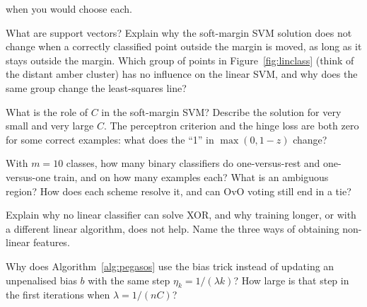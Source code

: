 \documentclass[11pt]{article}
\begin{document}
\begin{questions}
\begin{conceptual}
when you would choose each.
\item What are support vectors? Explain why the soft-margin SVM solution does not change when a correctly classified point
outside the margin is moved, as long as it stays outside the margin. Which group of points in
Figure~\ref{fig:linclass} (think of the distant amber cluster) has no influence on the linear SVM, and why does the same
group change the least-squares line?
\item What is the role of $C$ in the soft-margin SVM? Describe the solution for very small and very large $C$. The
perceptron criterion and the hinge loss are both zero for some correct examples: what does the ``1'' in $\max(0, 1 - z)$
change?
\item With $m = 10$ classes, how many binary classifiers do one-versus-rest and one-versus-one train, and on how many
examples each? What is an ambiguous region? How does each scheme resolve it, and can OvO voting still end in a tie?
\item Explain why no linear classifier can solve XOR, and why training longer, or with a different linear algorithm, does
not help. Name the three ways of obtaining non-linear features.
\item Why does Algorithm~\ref{alg:pegasos} use the bias trick instead of updating an unpenalised bias $b$ with the same
step $\eta_k = 1/(\lambda k)$? How large is that step in the first iterations when $\lambda = 1/(nC)$?
\end{conceptual}


\end{questions}
\end{document}
